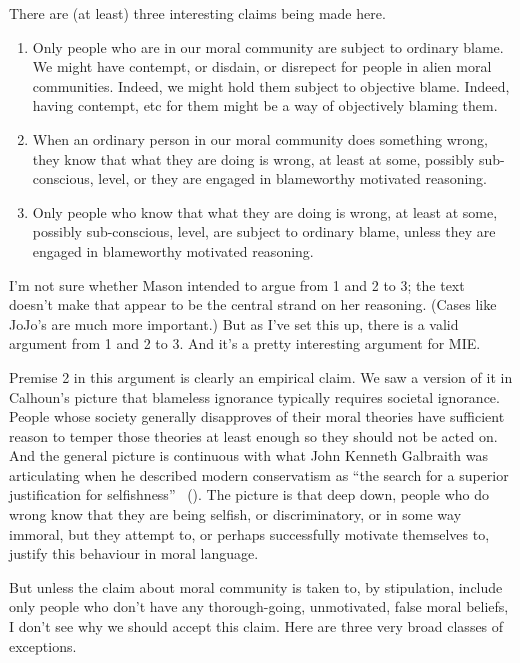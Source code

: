 \documentclass[
  10pt,
  letterpaper,
  twoside]{scrbook}
\providecommand{\tightlist}{%
  \setlength{\itemsep}{0pt}\setlength{\parskip}{0pt}}\usepackage{longtable,booktabs,array}
\begin{document}
There are (at least) three interesting claims being made here.

\begin{enumerate}
\def\labelenumi{\arabic{enumi}.}
\tightlist
\item
  Only people who are in our moral community are subject to ordinary
  blame. We might have contempt, or disdain, or disrepect for people in
  alien moral communities. Indeed, we might hold them subject to
  objective blame. Indeed, having contempt, etc for them might be a way
  of objectively blaming them.
\item
  When an ordinary person in our moral community does something wrong,
  they know that what they are doing is wrong, at least at some,
  possibly sub-conscious, level, or they are engaged in blameworthy
  motivated reasoning.
\item
  Only people who know that what they are doing is wrong, at least at
  some, possibly sub-conscious, level, are subject to ordinary blame,
  unless they are engaged in blameworthy motivated reasoning.
\end{enumerate}

I'm not sure whether Mason intended to argue from 1 and 2 to 3; the text
doesn't make that appear to be the central strand on her reasoning.
(Cases like JoJo's are much more important.) But as I've set this up,
there is a valid argument from 1 and 2 to 3. And it's a pretty
interesting argument for MIE.

Premise 2 in this argument is clearly an empirical claim. We saw a
version of it in Calhoun's picture that blameless ignorance typically
requires societal ignorance. People whose society generally disapproves
of their moral theories have sufficient reason to temper those theories
at least enough so they should not be acted on. And the general picture
is continuous with what John Kenneth Galbraith was articulating when he
described modern conservatism as ``the search for a superior
justification for selfishness'' ~(). The picture is that deep down, people who do wrong know that
they are being selfish, or discriminatory, or in some way immoral, but
they attempt to, or perhaps successfully motivate themselves to, justify
this behaviour in moral language.

But unless the claim about moral community is taken to, by stipulation,
include only people who don't have any thorough-going, unmotivated,
false moral beliefs, I don't see why we should accept this claim. Here
are three very broad classes of exceptions.
\end{document}
